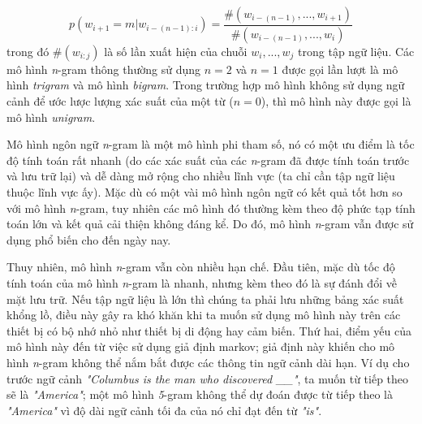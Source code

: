\begin{equation} \label{ngramLM}
	p \left(w_{i+1}=m|w_{i-(n-1):i} \right) = \frac{\# \left(w_{i-(n-1)},...,w_{i+1} \right)}{\# \left(w_{i-(n-1)},...,w_i \right)}
\end{equation}
trong đó $\#(w_{i:j})$ là số lần xuất hiện của chuỗi $w_i,...,w_j$ trong tập ngữ liệu. Các mô hình \textit{n}-gram thông thường sử dụng $n = 2$ và $n = 1$ được gọi lần lượt là mô hình \textit{trigram} và mô hình \textit{bigram}. Trong trường hợp mô hình không sử dụng ngữ cảnh để ước lược lượng xác
suất của một từ ($n = 0$), thì mô hình này được gọi là mô hình \textit{unigram}.

Mô hình ngôn ngữ \textit{n}-gram là một mô hình phi tham số, nó có một ưu điểm là tốc độ tính toán rất nhanh (do các xác suất của các \textit{n}-gram đã được tính toán trước và lưu trữ lại) và dễ dàng mở rộng cho nhiều lĩnh vực (ta chỉ cần tập ngữ liệu thuộc lĩnh vực ấy). Mặc dù có một vài mô hình ngôn ngữ có kết quả tốt hơn so với mô hình \textit{n}-gram, tuy nhiên các mô hình đó thường kèm theo độ phức tạp tính toán lớn và kết quả cải thiện không đáng kể. Do đó, mô hình \textit{n}-gram vẫn được sử dụng phổ biến cho đến ngày nay.

Thuy nhiên, mô hình \textit{n}-gram vẫn còn nhiều hạn chế. Đầu tiên, mặc dù tốc độ tính toán của mô hình \textit{n}-gram là nhanh, nhưng kèm theo đó là sự đánh đổi về mặt lưu trữ. Nếu tập ngữ liệu là lớn thì chúng ta phải lưu những bảng xác suất khổng lồ, điều này gây ra khó khăn khi ta muốn sử dụng mô hình này trên các thiết bị có bộ nhớ nhỏ như thiết bị di động hay cảm biến. Thứ hai, điểm yếu của mô hình này đến từ việc sử dụng giả định markov; giả định này khiến cho mô hình \textit{n}-gram không thể nắm bắt được các thông tin ngữ cảnh dài hạn. Ví dụ cho trước ngữ cảnh \textit{"Columbus is the man who discovered \_\_"}, ta muốn từ tiếp theo sẽ là \textit{"America"}; một mô hình \textit{5}-gram không thể dự đoán được từ tiếp theo là \textit{"America"} vì độ dài ngữ cảnh tối đa của nó chỉ đạt đến từ \textit{"is"}.

